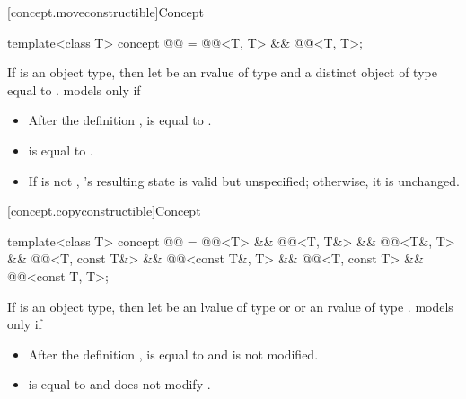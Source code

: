 [concept.moveconstructible]{Concept }

\begin{itemdecl}
template<class T>
  concept @@ = @@<T, T> && @@<T, T>;
\end{itemdecl}

\begin{itemdescr}
\pnum
If  is an object type, then let  be an rvalue of type
 and  a distinct object of type  equal to
.  models  only if

\begin{itemize}
\item After the definition ,  is equal to .

\item {} is equal to .

\item If  is not , 's resulting state is valid
but unspecified; otherwise, it is unchanged.
\end{itemize}
\end{itemdescr}

[concept.copyconstructible]{Concept }

\begin{itemdecl}
template<class T>
  concept @@ =
    @@<T> &&
    @@<T, T&> && @@<T&, T> &&
    @@<T, const T&> && @@<const T&, T> &&
    @@<T, const T> && @@<const T, T>;
\end{itemdecl}

\begin{itemdescr}
\pnum
If  is an object type, then let  be an lvalue of type
 or  or an rvalue of type .
 models  only if

\begin{itemize}
\item After the definition ,
 is equal to  and
 is not modified.

\item {} is equal to  and does not modify .
\end{itemize}

\end{itemdescr}


